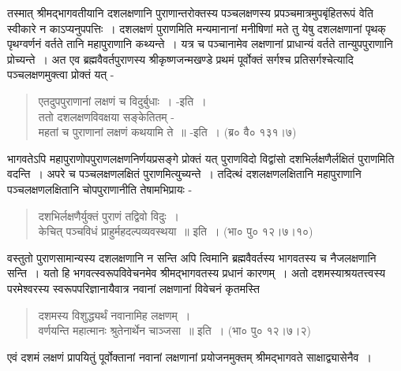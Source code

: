 तस्मात् श्रीमद्भागवतीयानि दशलक्षणानि पुराणान्तरोक्तस्य पञ्चलक्षणस्य प्रपञ्चमात्रमुपबृंहितरूपं वेति स्वीकारे न काऽप्यनुपपत्तिः~। दशलक्षणं पुराणमिति मन्यमानानां मनीषिणां मते तु येषु दशलक्षणानां पृथक् पृथग्वर्णनं वर्तते तानि महापुराणानि कथ्यन्ते~। यत्र च पञ्चानामेव लक्षणानां प्राधान्यं वर्तते तान्युपपुराणानि प्रोच्यन्ते~। अत एव ब्रह्मवैवर्तपुराणस्य श्रीकृष्णजन्मखण्डे प्रथमं पूर्वोक्तं सर्गश्च प्रतिसर्गश्चेत्यादि पञ्चलक्षणमुक्त्वा प्रोक्तं यत् -
\begin{verse}
एतदुपपुराणानां लक्षणं च विदुर्बुधाः~। -इति~।\\
ततो दशलक्षणविवक्षया सङ्केतितम् -\\
महतां च पुराणानां लक्षणं कथयामि ते~॥ -इति~। (ब्र० वै० १३१।७)
\end{verse}
भागवतेऽपि महापुराणोपपुराणलक्षणनिर्णयप्रसङ्गे प्रोक्तं यत् पुराणविदो विद्वांसो दशभिर्लक्षणैर्लक्षितं पुराणमिति वदन्ति~। अपरे च पञ्चलक्षणलक्षितं पुराणमित्युच्यन्ते~। तदित्थं दशलक्षणलक्षितानि महापुराणानि पञ्चलक्षणलक्षितानि चोपपुराणानीति तेषामभिप्रायः -
\begin{verse}
दशभिर्लक्षणैर्युक्तं पुराणं तद्विवो विदुः~।\\
केचित् पञ्चविधं प्राहुर्महदल्पव्यवस्थया~॥ इति~। (भा० पु० १२।७।१०)
\end{verse}
वस्तुतो पुराणसामान्यस्य दशलक्षणानि न सन्ति अपि त्विमानि ब्रह्मवैवर्तस्य भागवतस्य च नैजलक्षणानि सन्ति~। यतो हि भगवत्स्वरूपविवेचनमेव श्रीमद्भागवतस्य प्रधानं कारणम्~। अतो दशमस्याश्रयतत्त्वस्य परमेश्वरस्य स्वरूपपरिज्ञानायैवात्र नवानां लक्षणानां विवेचनं कृतमस्ति
\begin{verse}
दशमस्य विशुद्ध्यर्थं नवानामिह लक्षणम्~।\\
वर्णयन्ति महात्मानः श्रुतेनार्थेन चाञ्जसा~॥ इति~। (भा० पु० १२।७।२)
\end{verse}
एवं दशमं लक्षणं प्रापयितुं पूर्वोक्तानां नवानां लक्षणानां प्रयोजनमुक्तम् श्रीमद्भागवते साक्षाद्व्यासेनैव~।
